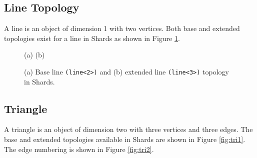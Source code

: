 \documentclass[pdf,12pt,relaxed]{SANDreport}
\begin{document}
\subsection{Line Topology}

 A line is an object of dimension 1 with two vertices. Both base and extended topologies exist for a line in Shards as shown in Figure \ref{fig:line}.

 \begin{figure}[ht]
   \begin{center}
     \hspace{1cm}
     \end{center}
  \begin{center}  (a) \hspace{5cm} (b) \end{center}
  \caption{(a) Base line {\tt (line<2>)} and (b) extended line {\tt (line<3>)} topology in Shards.}
  \label{fig:line}
 \end{figure}

\subsection{Triangle}

A triangle is an object of dimension two with three vertices and three edges. The base and extended topologies available in Shards are shown in Figure \ref{fig:tri1}. The edge numbering is shown in Figure \ref{fig:tri2}.
\end{document}
